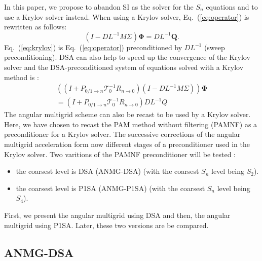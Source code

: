 \documentclass[preprint,10pt]{elsarticle}
\newcommand\bs{\boldsymbol}
\renewcommand{\(}{\left(}
\renewcommand{\)}{\right)}
\renewcommand{\[}{\left[}
\renewcommand{\]}{\right]}
\newcommand{\eqt}[1]{Eq.~(\ref{#1})}                     %
\begin{document}
In this paper, we propose to abandon SI as the solver for the $S_n$ equations 
and to use a Krylov solver instead. When using a Krylov solver, \eqt{eq:operator} is rewritten as follows:
%
\begin{equation}
(I-DL^{-1}M\Sigma) \bs{\Phi} = DL^{-1}\bs{Q} .
\label{eq:krylov}
\end{equation}
\eqt{eq:krylov} is \eqt{eq:operator}
%
preconditioned by $DL^{-1}$ (sweep preconditioning). 
DSA can also 
help to speed up the convergence of the Krylov solver and the DSA-preconditioned system of equations 
solved with a Krylov method is :
%
\begin{multline}
\((I+P_{0/1 \rightarrow n}\mathcal{T}_0^{-1} R_{n\rightarrow 0})(I-DL^{-1}M\Sigma)\)
\bs{\Phi} \\ = (I+P_{0/1 \rightarrow n}\mathcal{T}_0^{-1} R_{n\rightarrow 0})DL^{-1}Q
\end{multline}       
%
The angular multigrid scheme can also be recast to be used by a Krylov solver. Here, we have chosen
to recast the PAM method without filtering (PAMNF) as a preconditioner for a Krylov solver.
The successive corrections of the angular multigrid acceleration form
now different stages of a preconditioner used in the Krylov solver. Two
varitions of the PAMNF preconditioner will be tested :
\begin{itemize}
\item the coarsest level is DSA (ANMG-DSA) (with the coarsest $S_n$ level being $S_2$).
\item the coarsest level is P1SA (ANMG-P1SA) (with the coarsest $S_n$ level being $S_4$).
\end{itemize}
First, we present the angular multigrid using DSA and then, the angular
multigrid using P1SA. Later, these two versions are be compared.

\subsection{ANMG-DSA}
\end{document}
